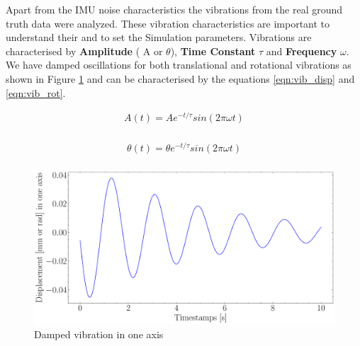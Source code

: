
Apart from the IMU noise characteristics the vibrations from the real ground truth data were analyzed. These vibration characteristics are important to understand their and to set the Simulation parameters. Vibrations are characterised by \textbf{Amplitude} ( A or  $ \theta $), \textbf{Time Constant} $ \tau $ and \textbf{Frequency} $ \omega $. We have damped oscillations for both translational and rotational vibrations as shown in Figure \ref{fig:damped_vib} and can be characterised by the equations \ref{eqn:vib_disp} and \ref{eqn:vib_rot}.

\begin{equation}
  \label{eqn:vib_disp}
  \begin{aligned}
    A(t) = Ae^{-t/\tau}sin(2\pi\omega t) \\
  \end{aligned}
\end{equation}

\begin{equation}
  \label{eqn:vib_rot}
  \begin{aligned}
    \theta(t) = \theta e^{-t/\tau}sin(2\pi\omega t) \\
  \end{aligned}
\end{equation}

\begin{figure}[H]
    \centering
    \includegraphics[scale=0.4]{images/fig_chapter4/vib_damped.pdf}
    \caption{Damped vibration in one axis}
    \label{fig:damped_vib}
\end{figure}

